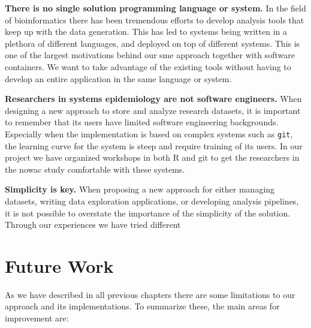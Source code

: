 \textbf{There is no single solution programming language or system.} In the
field of bioinformatics there has been tremendous efforts to develop analysis
tools that keep up with the data generation. This has led to systems being
written in a plethora of different languages, and deployed on top of different
systems.  This is one of the largest motivations behind our \gls{sme} approach
together with software containers. We want to take advantage of the existing
tools without having to develop an entire application in the same language or
system.

\textbf{Researchers in systems epidemiology are not software engineers.} When
designing a new approach to store and analyze research datasets, it is important
to remember that its users have limited software engineering backgrounds.
Especially when the implementation is based on complex systems such as
\texttt{git}, the learning curve for the system is steep and require training of
its users. In our project we have organized workshops in both R and git to get
the researchers in the \gls{nowac} study comfortable with these systems. 

\textbf{Simplicity is key.} When proposing a new approach for either managing
datasets, writing data exploration applications, or developing analysis
pipelines, it is not possible to overstate the importance of the simplicity of
the solution. Through our experiences we have tried different 



\section{Future Work}
As we have described in all previous chapters there are some limitations to our
approach and its implementations. To summarize these, the main areas for
improvement are: 

